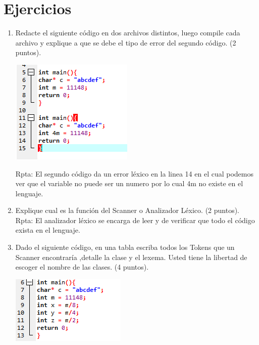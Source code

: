 \documentclass{article}
\begin{document}
	\section{Ejercicios}\label{sec:ejercicios}
	\begin{enumerate}
		\item Redacte el siguiente código en dos archivos distintos, luego compile cada archivo y explique a que se debe el tipo de error del segundo código. (2 puntos).
		\begin{center}
		     \includegraphics[width=.3\textwidth]{Imagenes/ejercicio 1.png}
		\end{center}
		Rpta: El segundo código da un error léxico en la linea 14 en el cual podemos ver que el variable no puede ser un numero por lo cual 4m no existe en el lenguaje. 
		\item Explique cual es la función del Scanner o Analizador Léxico. (2 puntos). \\
		Rpta: El analizador léxico se encarga de leer y de verificar que todo el código exista en el lenguaje. \newpage
		\item Dado el siguiente código, en una tabla escriba todos los Tokens que un Scanner encontraría ,detalle la clase y el lexema. Usted tiene la libertad de escoger el nombre de las clases. (4 puntos).
		\begin{center}
		     \includegraphics[width=.5\textwidth]{Imagenes/ejercicio 3.png}

\end{center}
\end{enumerate}
\end{document}
